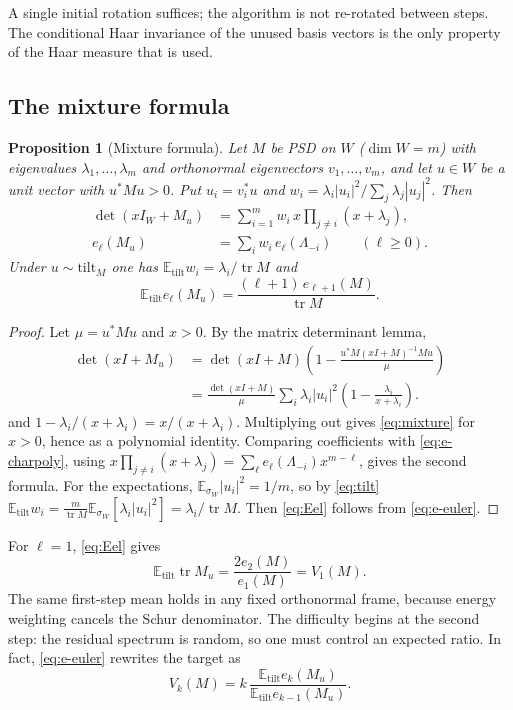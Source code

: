 \documentclass[11pt,a4paper]{article}
\newtheorem{proposition}[theorem]{Proposition}
\theoremstyle{definition}
\newcommand{\E}{\mathbb{E}}
\newcommand{\tr}{\operatorname{tr}}
\newcommand{\tilt}{\mathrm{tilt}}
\begin{document}
A single initial rotation suffices; the algorithm is not re-rotated between steps. The conditional Haar invariance of the unused basis vectors is the only property of the Haar measure that is used.

\subsection{The mixture formula}
\begin{proposition}[Mixture formula]\label{prop:mixture}
Let $M$ be PSD on $W$ ($\dim W=m$) with eigenvalues $\lambda_1,\dots,\lambda_m$ and orthonormal eigenvectors $v_1,\dots,v_m$, and let $u\in W$ be a unit vector with $u^*Mu>0$. Put $u_i=v_i^*u$ and $w_i=\lambda_i|u_i|^2/\sum_j\lambda_j|u_j|^2$. Then
\begin{equation}\label{eq:mixture}
\begin{aligned}
\det(xI_W+M_u)&=\sum_{i=1}^mw_i\,x\prod_{j\ne i}(x+\lambda_j),\\
e_\ell(M_u)&=\sum_iw_i\,e_\ell(\Lambda_{-i})\qquad(\ell\ge0).
\end{aligned}
\end{equation}
Under $u\sim\tilt_M$ one has $\E_\tilt w_i=\lambda_i/\tr M$ and
\begin{equation}\label{eq:Eel}
\E_\tilt e_\ell(M_u)=\frac{(\ell+1)\,e_{\ell+1}(M)}{\tr M}.
\end{equation}
\end{proposition}

\begin{proof}
Let $\mu=u^*Mu$ and $x>0$. By the matrix determinant lemma,
\begin{align*}
\det(xI+M_u)
&=\det(xI+M)\left(1-\frac{u^*M(xI+M)^{-1}Mu}{\mu}\right)\\
&=\frac{\det(xI+M)}{\mu}
  \sum_i\lambda_i|u_i|^2\left(1-\frac{\lambda_i}{x+\lambda_i}\right).
\end{align*}
and $1-\lambda_i/(x+\lambda_i)=x/(x+\lambda_i)$. Multiplying out gives \eqref{eq:mixture} for $x>0$, hence as a polynomial identity. Comparing coefficients with \eqref{eq:e-charpoly}, using $x\prod_{j\ne i}(x+\lambda_j)=\sum_\ell e_\ell(\Lambda_{-i})x^{m-\ell}$, gives the second formula. For the expectations, $\E_{\sigma_W}|u_i|^2=1/m$, so by \eqref{eq:tilt} $\E_\tilt w_i=\frac m{\tr M}\E_{\sigma_W}[\lambda_i|u_i|^2]=\lambda_i/\tr M$. Then \eqref{eq:Eel} follows from \eqref{eq:e-euler}.
\end{proof}

For $\ell=1$, \eqref{eq:Eel} gives
\[
\E_\tilt\tr M_u=\frac{2e_2(M)}{e_1(M)}=V_1(M).
\]
The same first-step mean holds in any fixed orthonormal frame, because energy weighting cancels the Schur denominator. The difficulty begins at the second step: the residual spectrum is random, so one must control an expected ratio. In fact, \eqref{eq:e-euler} rewrites the target as
\[
V_k(M)=k\,\frac{\E_\tilt e_k(M_u)}{\E_\tilt e_{k-1}(M_u)}.
\]
\end{document}
